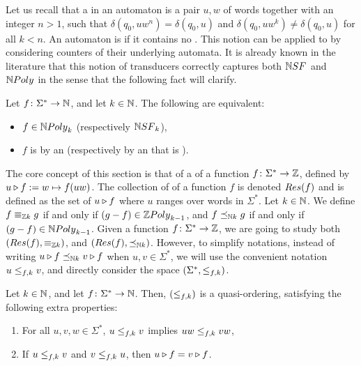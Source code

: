 \AP Let us recall that a  in an automaton is a pair $u,w$ of
words together with an integer $n > 1$, such that $\delta(q_0, uw^n) =
\delta(q_0, u)$ and $\delta(q_0, u w^k) \neq \delta(q_0, u)$ for all $k < n$.
An automaton is  if it contains no .
This notion can be applied to  by considering
counters of their underlying automata. It is already known in the literature
that this notion of transducers correctly captures both $\NSF$ and $\NPoly$ in
the sense that the following fact will clarify.

\begin{lemma}
    \label{transducer-nsf-npoly:lemma}
    Let $f \colon \Sigma^* \to \Nat$, and let $k \in \Nat$.
    The following are equivalent:
    \begin{itemize}
        \item $f \in \NPoly[k]$ (respectively $\NSF[k]$),
        \item $f$ is  by an 
            (respectively by an  that is 
            ).
    \end{itemize}
\end{lemma}

\AP The core concept of this section is that of a  of a
function $f \colon \Sigma^* \to \Rel$,  defined by $\app{f}{u} \defined w
\mapsto f(uw)$. The collection of  of a function $f$ is
denoted $\Res(f)$ and is defined as the set of $\app{f}{u}$ where $u$ ranges
over words in $\Sigma^*$. Let $k \in \Nat$. We define $f \zpolyequiv[k] g$ if
and only if $(g - f) \in \ZPoly[k-1]$, and $f \npolyleq[k] g$ if and only if
$(g - f) \in \NPoly[k-1]$. Given a function $f \colon \Sigma^* \to \Rel$, we
are going to study both $(\Res(f), \zpolyequiv[k])$, and $(\Res(f),
\npolyleq[k])$. However, to simplify notations, instead of writing $\app{f}{u}
\npolyleq[k] \app{f}{v}$ when $u,v \in \Sigma^*$, we will use the convenient
notation $u \resleq{f}{k} v$, and directly consider the space $(\Sigma^*,
\resleq{f}{k})$.

\begin{fact}
    \label{good-residual-ordering:fact}
    Let $k \in \Nat$, and let $f \colon \Sigma^* \to \Nat$. Then,
    $(\resleq{f}{k})$ is a quasi-ordering, satisfying the following
    extra properties:
    \begin{enumerate}
        \item For all $u,v,w \in \Sigma^*$, $u \resleq{f}{k} v$
            implies $uw \resleq{f}{k} vw$,
        \item If $u \resleq{f}{k} v$ and $v \resleq{f}{k} u$,
            then $\app{f}{u} = \app{f}{v}$.
    \end{enumerate}
\end{fact}

